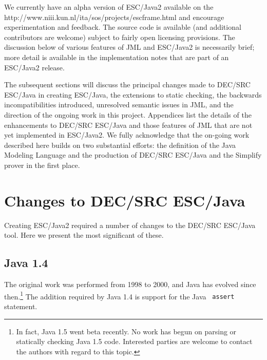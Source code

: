\documentclass{sig-alternate}
\begin{document}
We currently have an alpha version of ESC/Java2 available on the
{http://www.niii.kun.nl/ita/sos/projects/escframe.html} and encourage
experimentation and feedback.  The source code is available
(and additional contributors are welcome) subject to fairly open
licensing provisions.  The discussion below of various features of JML
and ESC/Java2 is necessarily brief; more detail is available in the
implementation notes that are part of an ESC/Java2 release.

The subsequent sections will discuss the principal changes made to
DEC/SRC ESC/Java in creating ESC/Java, the extensions to
static checking, the backwards incompatibilities introduced,
unresolved semantic issues in JML, and the direction of the ongoing work
in this project.  Appendices list the details of the enhancements to
DEC/SRC ESC/Java and those features of JML
that are not yet implemented in ESC/Java2.  We fully acknowledge that
the on-going work described here builds on two substantial efforts:
the definition of the Java Modeling
Language
and
the production of DEC/SRC ESC/Java and the Simplify prover in
the first place.


\section{Changes to DEC/SRC ESC/Java}

Creating ESC/Java2 required a number of changes to the DEC/SRC
ESC/Java tool.  Here we present the most significant
of these.
\subsection{Java 1.4}
The original work was performed from 1998 to 2000, and Java has evolved
since then.\footnote{In fact, Java 1.5 went beta recently.  No work has begun on
  parsing or statically checking Java 1.5 code.  Interested parties
  are welcome to contact the authors with regard to this topic.}  The
addition required by Java 1.4 is support for the Java {\tt
  assert} statement.  

\end{document}
